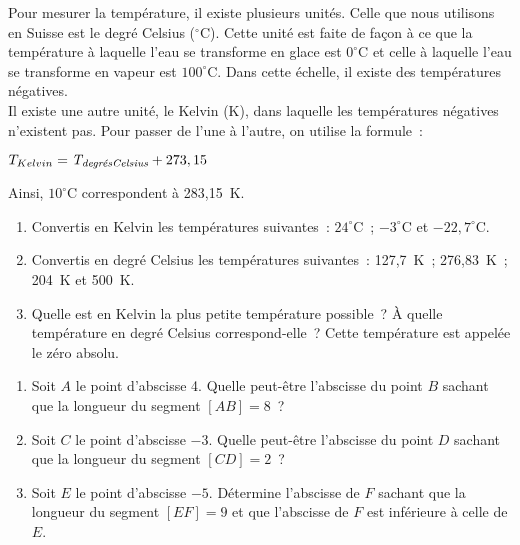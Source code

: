 \begin{exercice}[Températures]
Pour mesurer la température, il existe plusieurs unités. Celle que nous utilisons en Suisse est le degré Celsius ($^\circ$C). Cette unité est faite de façon à ce que la température à laquelle l'eau se transforme en glace est $0^\circ$C et celle à laquelle l'eau se transforme en vapeur est $100^\circ$C. Dans cette échelle, il existe des températures négatives. \\[0.5em]
Il existe une autre unité, le Kelvin (K), dans laquelle les températures négatives n'existent pas. Pour passer de l'une à l'autre, on utilise la formule :

\begin{center} $T_{Kelvin} = \emph{$\textrm{T}_\textrm{degrésCelsius}$} + 273,15$ \end{center}
       
Ainsi, $10^\circ$C correspondent à 283,15 K.
\begin{enumerate}
 \item Convertis en Kelvin les températures suivantes : $24^\circ$C ; $- 3^\circ$C et $- 22,7^\circ$C.
 \item Convertis en degré Celsius les températures suivantes : 127,7 K ; 276,83 K ; 204 K et 500 K.
 \item Quelle est en Kelvin la plus petite température possible ? À quelle température en degré Celsius correspond-elle ? Cette température est appelée le zéro absolu.
 \end{enumerate}
\end{exercice}


\begin{exercice}
\begin{enumerate}
 \item Soit $A$ le point d'abscisse 4. Quelle peut-être l'abscisse du point $B$ sachant que la longueur du segment $[AB] = 8$ ?
 \item Soit $C$ le point d'abscisse $- 3$. Quelle peut-être l'abscisse du point $D$ sachant que la longueur du segment $[CD] = 2$ ?
 \item Soit $E$ le point d'abscisse $- 5$. Détermine l'abscisse de $F$ sachant que la longueur du segment $[EF] = 9$ et que l'abscisse de $F$ est inférieure à celle de $E$.
 \end{enumerate}
\end{exercice}


